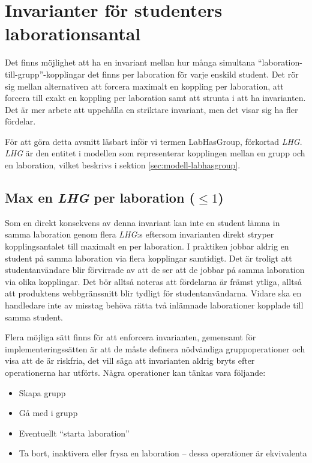 \section{Invarianter för studenters laborationsantal}

Det finns möjlighet att ha en invariant mellan hur många simultana “laboration-till-grupp”-kopplingar det finns per laboration för varje enskild student. Det rör sig mellan alternativen att forcera maximalt en koppling per laboration, att forcera till exakt en koppling per laboration samt att strunta i att ha invarianten. Det är mer arbete att uppehålla en striktare invariant, men det visar sig ha fler fördelar.

För att göra detta avsnitt läsbart inför vi termen LabHasGroup, förkortad \emph{LHG}. \emph{LHG} är den entitet i modellen som representerar kopplingen mellan en grupp och en laboration, vilket beskrivs i sektion \ref{sec:modell-labhasgroup}. 

\subsection{Max en \emph{LHG} per laboration ($\leq 1$)}
Som en direkt konsekvens av denna invariant kan inte en student lämna in samma laboration genom flera \emph{LHG}:s eftersom invarianten direkt stryper kopplingsantalet till maximalt en per laboration. I praktiken jobbar aldrig en student på samma laboration via flera kopplingar samtidigt. Det är troligt att studentanvändare blir förvirrade av att de ser att de jobbar på samma laboration via olika kopplingar. Det bör alltså noteras att fördelarna är främst  ytliga, alltså att produktens webbgränssnitt blir tydligt för studentanvändarna. Vidare ska en handledare inte av misstag behöva rätta två inlämnade laborationer kopplade till samma student.

Flera möjliga sätt finns för att enforcera invarianten, gemensamt för implementeringssätten är att de måste definera nödvändiga gruppoperationer och visa att de är riskfria, det vill säga att invarianten aldrig bryts efter operationerna har utförts. Några operationer kan tänkas vara följande:

\begin{itemize}
  \item Skapa grupp
  \item Gå med i grupp
  \item Eventuellt “starta laboration”
  \item Ta bort,  inaktivera eller frysa en laboration – dessa operationer är ekvivalenta
\end{itemize} 

